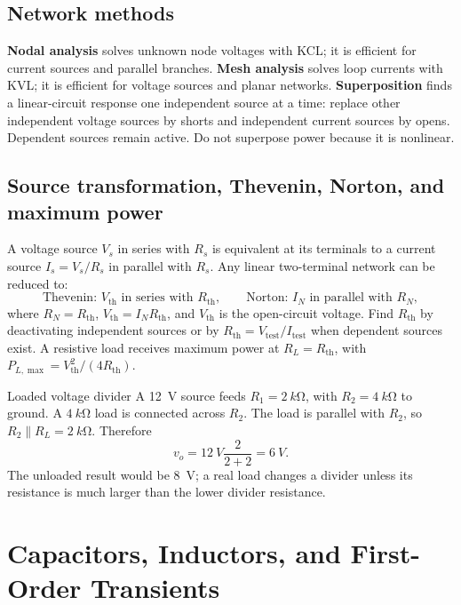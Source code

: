 \documentclass[10pt]{article}
\begin{document}
\subsection{Network methods}
\textbf{Nodal analysis} solves unknown node voltages with KCL; it is efficient for
current sources and parallel branches. \textbf{Mesh analysis} solves loop currents
with KVL; it is efficient for voltage sources and planar networks. \textbf{Superposition}
finds a linear-circuit response one independent source at a time: replace other
independent voltage sources by shorts and independent current sources by opens.
Dependent sources remain active. Do not superpose power because it is nonlinear.

\subsection{Source transformation, Thevenin, Norton, and maximum power}
A voltage source $V_s$ in series with $R_s$ is equivalent at its terminals to a
current source $I_s=V_s/R_s$ in parallel with $R_s$. Any linear two-terminal
network can be reduced to:
\begin{equation}
  \text{Thevenin: }V_{\mathrm{th}}\text{ in series with }R_{\mathrm{th}},
  \qquad \text{Norton: }I_N\text{ in parallel with }R_N,
\end{equation}
where $R_N=R_{\mathrm{th}}$, $V_{\mathrm{th}}=I_NR_{\mathrm{th}}$, and
$V_{\mathrm{th}}$ is the open-circuit voltage. Find $R_{\mathrm{th}}$ by deactivating
independent sources or by $R_{\mathrm{th}}=V_{\mathrm{test}}/I_{\mathrm{test}}$ when
dependent sources exist. A resistive load receives maximum power at
$R_L=R_{\mathrm{th}}$, with $P_{L,\max}=V_{\mathrm{th}}^2/(4R_{\mathrm{th}})$.

\begin{examplebox}{Loaded voltage divider}
A \SI{12}{V} source feeds $R_1=\SI{2}{k\ohm}$, with $R_2=\SI{4}{k\ohm}$ to
ground. A $\SI{4}{k\ohm}$ load is connected across $R_2$. The load is parallel
with $R_2$, so $R_2\parallel R_L=\SI{2}{k\ohm}$. Therefore
\[
 v_o=\SI{12}{V}\frac{2}{2+2}=\SI{6}{V}.
\]
The unloaded result would be \SI{8}{V}; a real load changes a divider unless its
resistance is much larger than the lower divider resistance.
\end{examplebox}

\section{Capacitors, Inductors, and First-Order Transients}
\end{document}

